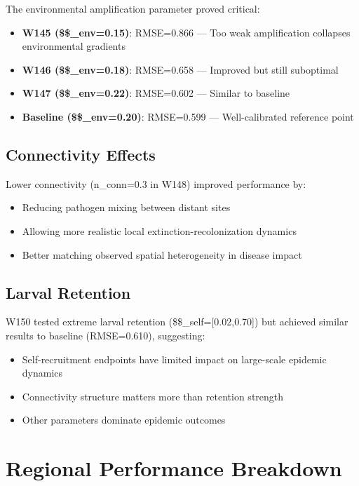 \documentclass[11pt]{article}
\begin{document}
The environmental amplification parameter proved critical:

\begin{itemize}
\item \textbf{W145 (\$\alpha\$\_env=0.15)}: RMSE=0.866 — Too weak amplification collapses environmental gradients
\item \textbf{W146 (\$\alpha\$\_env=0.18)}: RMSE=0.658 — Improved but still suboptimal
\item \textbf{W147 (\$\alpha\$\_env=0.22)}: RMSE=0.602 — Similar to baseline
\item \textbf{Baseline (\$\alpha\$\_env=0.20)}: RMSE=0.599 — Well-calibrated reference point
\end{itemize}

\subsection{Connectivity Effects}

Lower connectivity (n\_conn=0.3 in W148) improved performance by:
\begin{itemize}
\item Reducing pathogen mixing between distant sites
\item Allowing more realistic local extinction-recolonization dynamics  
\item Better matching observed spatial heterogeneity in disease impact
\end{itemize}

\subsection{Larval Retention}

W150 tested extreme larval retention (\$\alpha\$\_self=[0.02,0.70]) but achieved similar results to baseline (RMSE=0.610), suggesting:
\begin{itemize}
\item Self-recruitment endpoints have limited impact on large-scale epidemic dynamics
\item Connectivity structure matters more than retention strength
\item Other parameters dominate epidemic outcomes
\end{itemize}

\section{Regional Performance Breakdown}
\end{document}
